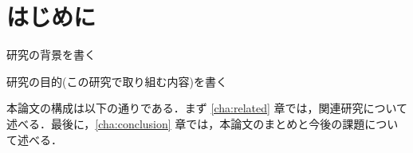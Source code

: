 \documentclass[main]{subfiles}
\begin{document}
\chapter{はじめに}
\label{cha:intro}

研究の背景を書く

研究の目的(この研究で取り組む内容)を書く

本論文の構成は以下の通りである．まず \ref{cha:related} 章では，関連研究について述べる．最後に，\ref{cha:conclusion} 章では，本論文のまとめと今後の課題について述べる．
\end{document}
